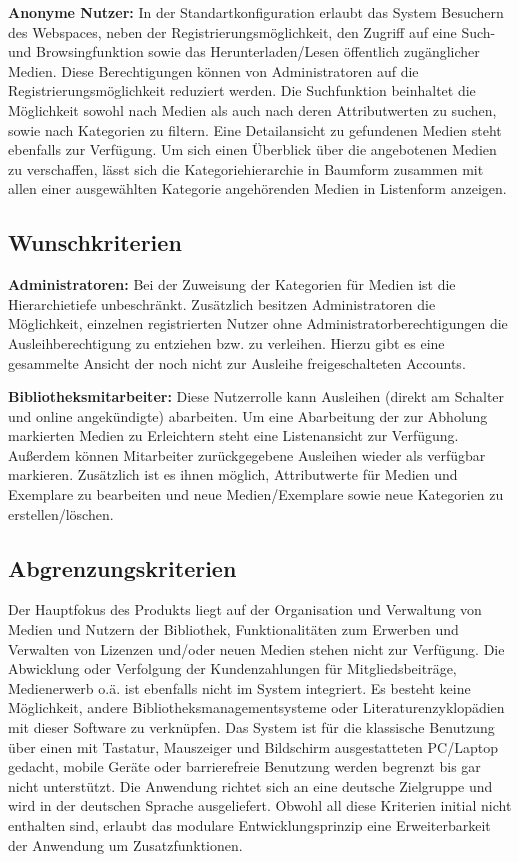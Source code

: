 \documentclass{article}
\begin{document}
\begin{flushleft}
\textbf{Anonyme Nutzer:} In der Standartkonfiguration erlaubt das System Besuchern des Webspaces, neben der Registrierungsmöglichkeit, den Zugriff auf eine Such- und Browsingfunktion sowie das Herunterladen/Lesen öffentlich zugänglicher Medien. Diese Berechtigungen können von Administratoren auf die Registrierungsmöglichkeit reduziert werden. Die Suchfunktion beinhaltet die Möglichkeit sowohl nach Medien als auch nach deren Attributwerten zu suchen, sowie nach Kategorien zu filtern. Eine Detailansicht zu gefundenen Medien steht ebenfalls zur Verfügung. Um sich einen Überblick über die angebotenen Medien zu verschaffen, lässt sich die Kategoriehierarchie in Baumform zusammen mit allen einer ausgewählten Kategorie angehörenden Medien in Listenform anzeigen.
\end{flushleft}
\subsection{Wunschkriterien}
\begin{flushleft}
\textbf{Administratoren:} Bei der Zuweisung der Kategorien für Medien ist die Hierarchietiefe unbeschränkt. Zusätzlich besitzen Administratoren die Möglichkeit, einzelnen registrierten Nutzer ohne Administratorberechtigungen die Ausleihberechtigung zu entziehen bzw. zu verleihen. Hierzu gibt es eine gesammelte Ansicht der noch nicht zur Ausleihe freigeschalteten  Accounts.
\end{flushleft}
\begin{flushleft}
\textbf{Bibliotheksmitarbeiter:} Diese Nutzerrolle kann Ausleihen (direkt am Schalter und online angekündigte) abarbeiten. Um eine Abarbeitung der zur Abholung markierten Medien zu Erleichtern steht eine Listenansicht zur Verfügung. Außerdem können Mitarbeiter zurückgegebene Ausleihen wieder als verfügbar markieren. Zusätzlich ist es ihnen möglich, Attributwerte für Medien und Exemplare zu bearbeiten und neue Medien/Exemplare sowie neue Kategorien zu erstellen/löschen.
\end{flushleft}
\subsection{Abgrenzungskriterien}
Der Hauptfokus des Produkts liegt auf der Organisation und Verwaltung von Medien und Nutzern der Bibliothek, Funktionalitäten zum Erwerben und Verwalten von Lizenzen und/oder neuen Medien stehen nicht zur Verfügung. Die Abwicklung oder Verfolgung der Kundenzahlungen für Mitgliedsbeiträge, Medienerwerb o.ä. ist ebenfalls nicht im System integriert. Es besteht keine Möglichkeit, andere Bibliotheksmanagementsysteme oder Literaturenzyklopädien mit dieser Software zu verknüpfen. Das System ist für die klassische Benutzung über einen mit Tastatur, Mauszeiger und Bildschirm ausgestatteten PC/Laptop gedacht, mobile Geräte oder barrierefreie Benutzung werden begrenzt bis gar nicht unterstützt. Die Anwendung richtet sich an eine deutsche Zielgruppe und wird in der deutschen Sprache ausgeliefert. Obwohl all diese Kriterien initial nicht enthalten sind, erlaubt das modulare Entwicklungsprinzip eine Erweiterbarkeit der Anwendung um Zusatzfunktionen.
\end{document}
